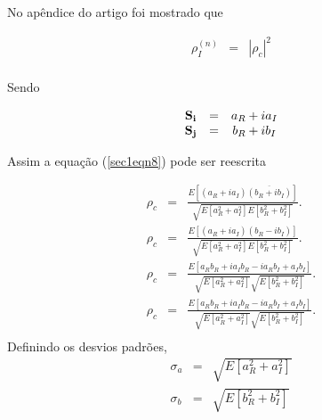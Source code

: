 \documentclass[10pt,a4paper]{article}
\begin{document}
No apêndice do artigo \cite{lee94} foi mostrado que 

\begin{equation}\label{sec1eqn10}
\begin{array}{ccc}
	\rho_I^{(n)}&=& \left|\rho_c\right|^2\\
\end{array}
\end{equation}

Sendo 

\begin{equation}\label{sec1eqn11}
\begin{array}{ccc}
     {\bf S_i}	&=&a_{R}+ia_{I} \\
     {\bf S_j}  &=&b_{R}+ib_{I} \\
\end{array}
\end{equation}

Assim a equação (\ref{sec1eqn8}) pode ser reescrita

\begin{equation}\label{sec1eqn12}
\begin{array}{ccc}
	\rho_c&=&\frac{E[(a_{R}+ia_{I})\overline{(b_{R}+ib_{I})}]}{\sqrt{E[a_{R}^2+a_{I}^2]E[b_{R}^2+b_{I}^2]}}. \\
	\rho_c&=&\frac{E[(a_{R}+ia_{I})(b_{R}-ib_{I})]}{\sqrt{E[a_{R}^2+a_{I}^2]E[b_{R}^2+b_{I}^2]}}. \\
	\rho_c&=&\frac{E[a_{R}b_{R}+ia_{I}b_{R}-ia_{R}b_{I}+a_{I}b_{I}]}{\sqrt{E[a_{R}^2+a_{I}^2]}\sqrt{E[b_{R}^2+b_{I}^2]}}. \\
	\rho_c&=&\frac{E[a_{R}b_{R}+ia_{I}b_{R}-ia_{R}b_{I}+a_{I}b_{I}]}{\sqrt{E[a_{R}^2+a_{I}^2]}\sqrt{E[b_{R}^2+b_{I}^2]}}. \\
\end{array}
\end{equation}
Definindo os desvios padrões,
\begin{equation}\label{sec1eqn13}
\begin{array}{ccc}
	\sigma_{a}	&=&\sqrt{E[a_{R}^2+a_{I}^2]} \\
	\sigma_{b}      &=&\sqrt{E[b_{R}^2+b_{I}^2]} \\
\end{array}
\end{equation}
\end{document}

